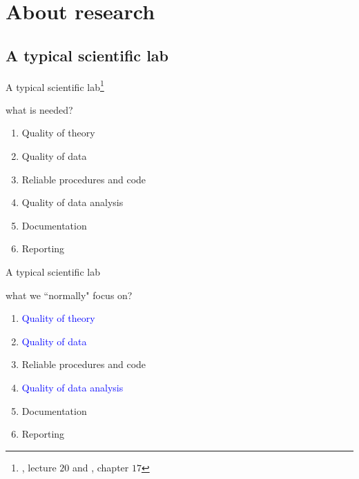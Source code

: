\section{About research}
%
%
\subsection{A typical scientific lab}
%
%
\begin{frame}[t, negative]
	\subsectionpage
\end{frame}
%
%
\begin{lhframe}[rhgraphic={\texttt{[image: lab1.jpg]}}]
	{A typical scientific lab\footnote{\citet{McElreath_2020}, lecture $20$ and \citet{McElreath_2022}, chapter $17$ \nocite{McElreath_2019} \nocite{Hernan_et_al_2020} \nocite{Cunningham_2022} } }
	
	what is needed? \\
	
	\begin{enumerate}
		\item Quality of theory
		\item Quality of data
		\item Reliable procedures and code
		\item Quality of data analysis
		\item Documentation
		\item Reporting
	\end{enumerate} 
\end{lhframe}
%
%
\begin{lhframe}[rhgraphic={\texttt{[image: woman\_cat.jpg]}}]
	{A typical scientific lab}
	
	what we ``normally" focus on? \\
	
	\begin{enumerate}
		\item \textcolor{blue}{Quality of theory}
		\item \textcolor{blue}{Quality of data}
		\item Reliable procedures and code
		\item \textcolor{blue}{Quality of data analysis}
		\item Documentation
		\item Reporting
	\end{enumerate}
\end{lhframe}
